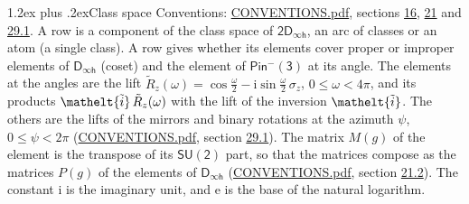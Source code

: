 \documentclass[10pt,a4paper]{article}
\makeatletter
\renewcommand\section{\@startsection{section}{1}{\z@}{-3ex plus -1ex minus -.2ex}%
  {1.2ex plus .2ex}{\normalfont\large\sffamily\bfseries\color{parttitle}}}
\numberwithin{equation}{section}
\newcommand{\eltfont}[1]{{\let\sigma\eltsigma\mathelt{#1}}}
\newcommand{\grp}[1]{\mathsf{#1}}
\newcommand{\elt}[1]{\eltfont{#1}}
\newcommand{\iunit}{\mathrm{i}}
\newcommand{\expe}{\mathrm{e}}
\newcommand{\lift}[1]{\tilde{#1}}
\newcommand{\pauli}[1]{\sigma_{#1}}
\makeatother
\begin{document}
\section{Class space}\label{s:class_space}
Conventions: \href{../../CONVENTIONS.pdf}{CONVENTIONS.pdf}, sections \href{../../../rotation/CONVENTIONS.pdf\#conv.16}{16}, \href{../../CONVENTIONS.pdf\#conv.21}{21} and \href{../../CONVENTIONS.pdf\#conv.29.1}{29.1}.
\leavevmode\label{n:head.component}A row is a component of the class space of $\grp{2D_{\infty h}}$, an arc of classes or an atom (a single class). \label{n:head.coset}\label{n:head.element}A row gives whether its elements cover proper or improper elements of \href{../../../rotation/data/pdf/Dinfh.pdf}{$\grp{D_{\infty h}}$} (coset) and the element of $\grp{Pin^{-}(3)}$ at its angle. \label{n:angle.omega}\label{n:angle.psi}The elements at the angles are the lift $\lift{R}_z(\omega) = \cos\tfrac{\omega}{2} - \iunit\sin\tfrac{\omega}{2}\,\pauli{z}$, $0 \le \omega < 4\pi$, and its products $\elt{\lift{i}}\,\lift{R}_z(\omega)$ with the lift of the inversion $\elt{\lift{i}}$. The others are the lifts of the mirrors and binary rotations at the azimuth $\psi$, $0 \le \psi < 2\pi$ (\href{../../CONVENTIONS.pdf}{CONVENTIONS.pdf}, section \href{../../CONVENTIONS.pdf\#conv.29.1}{29.1}). \label{n:matrix.element.pin}The matrix $M(g)$ of the element is the transpose of its $\grp{SU(2)}$ part, so that the matrices compose as the matrices $P(g)$ of the elements of \href{../../../rotation/data/pdf/Dinfh.pdf}{$\grp{D_{\infty h}}$} (\href{../../CONVENTIONS.pdf}{CONVENTIONS.pdf}, section \href{../../CONVENTIONS.pdf\#conv.21.2}{21.2}).
The constant $\iunit$ is the imaginary unit, and $\expe$ is the base of the natural logarithm.
\end{document}
